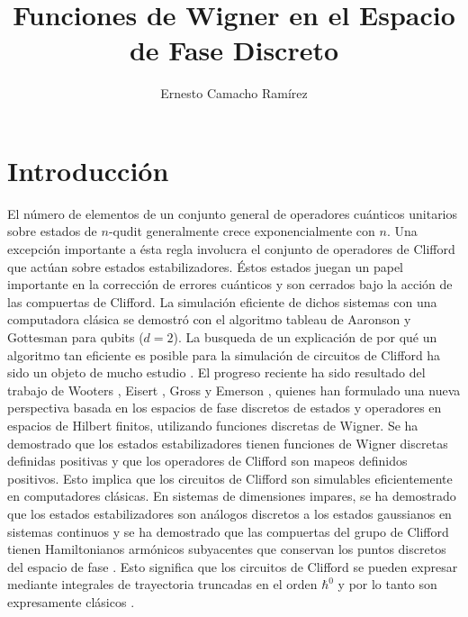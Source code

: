 \documentclass[a4paper]{report}
\title{Funciones de Wigner en el Espacio de Fase Discreto}
\author{Ernesto Camacho Ramírez}
\begin{document}
  \maketitle

  \tableofcontents

  \chapter{Introducción}

  El número de elementos de un conjunto general de
  operadores cuánticos unitarios sobre estados de $n$-qudit
  generalmente crece exponencialmente con $n$. Una excepción
  importante a ésta regla involucra el conjunto de
  operadores de Clifford que actúan sobre estados
  estabilizadores. Éstos estados juegan un papel importante
  en la corrección de errores cuánticos
  \cite{gottesmanHeisenbergRepresentationQuantum1998} y son
  cerrados bajo la acción de las compuertas de Clifford. La
  simulación eficiente de dichos sistemas con una
  computadora clásica se demostró con el algoritmo tableau
  de Aaronson y Gottesman \cite{
    aaronsonImprovedSimulationStabilizer2004,
  gottesmanHeisenbergRepresentationQuantum1998} para qubits
  ($d=2$). La busqueda de un explicación de por qué un
  algoritmo tan eficiente es posible para la simulación de
  circuitos de Clifford ha sido un objeto de mucho estudio
  \cite{gottesmanFaultTolerantQuantumComputation1999,
    howardContextualitySuppliesMagic2014,
  mariPositiveWignerFunctions2012}. El progreso reciente ha
  sido resultado del trabajo de Wooters
  \cite{woottersWignerFunctionFormulationFiniteState1987},
  Eisert \cite{mariPositiveWignerFunctions2012}, Gross
  \cite{grossHudsonTheoremFinitedimensional2006} y Emerson
  \cite{howardContextualitySuppliesMagic2014}, quienes han
  formulado una nueva perspectiva basada en los espacios de
  fase discretos de estados y operadores en espacios de
  Hilbert finitos, utilizando funciones discretas de Wigner.
  Se ha demostrado que los estados estabilizadores tienen
  funciones de Wigner discretas definidas positivas y que
  los operadores de Clifford son mapeos definidos positivos.
  Esto implica que los circuitos de Clifford son simulables
  eficientemente en computadores clásicas. En sistemas de
  dimensiones impares, se ha demostrado que los estados
  estabilizadores son análogos discretos a los estados
  gaussianos en sistemas continuos
  \cite{grossHudsonTheoremFinitedimensional2006} y se ha
  demostrado que las compuertas del grupo de Clifford tienen
  Hamiltonianos armónicos subyacentes que conservan los
  puntos discretos del espacio de fase
  \cite{kociaSemiclassicalFormulationGottesmanKnill2017}.
  Esto significa que los circuitos de Clifford se pueden
  expresar mediante integrales de trayectoria truncadas en
  el orden $\hbar^{0}$ y por lo tanto son expresamente
  clásicos
  \cite{kociaSemiclassicalFormulationGottesmanKnill2017,
  kohComputingQuopitClifford2017}.
\end{document}

